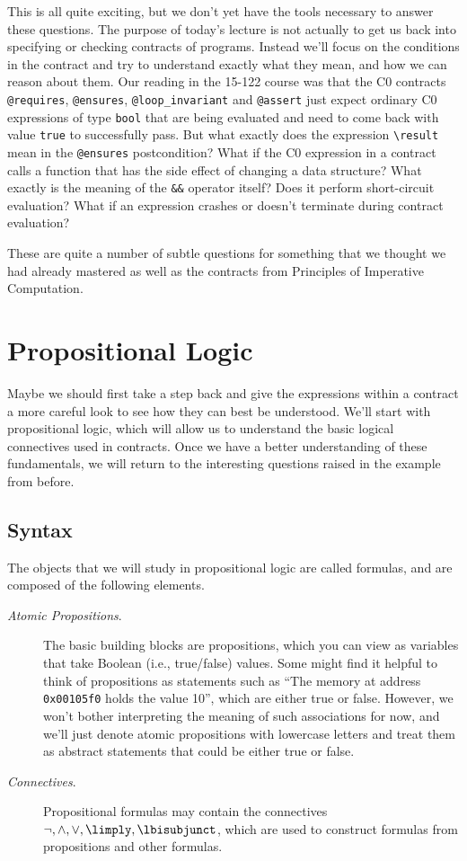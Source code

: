 \documentclass[11pt,twoside]{scrartcl}
\begin{document}
This is all quite exciting, but we don't yet have the tools necessary to answer these questions.
The purpose of today's lecture is not actually to get us back into specifying or checking contracts of programs. Instead we'll focus on the conditions in the contract and try to understand exactly what they mean, and how we can reason about them.
Our reading in the 15-122 course was that the C0 contracts \texttt{@requires}, \texttt{@ensures}, \texttt{@loop\_invariant} and \texttt{@assert} just expect ordinary C0 expressions of type \verb'bool' that are being evaluated and need to come back with value \verb'true' to successfully pass.
But what exactly does the expression \verb'\result' mean in the \texttt{@ensures} postcondition?
What if the C0 expression in a contract calls a function that has the side effect of changing a data structure?
What exactly is the meaning of the \verb'&&' operator itself?
Does it perform short-circuit evaluation?
What if an expression crashes or doesn't terminate during contract evaluation?

These are quite a number of subtle questions for something that we thought we had already mastered as well as the contracts from Principles of Imperative Computation.


\section{Propositional Logic}

Maybe we should first take a step back and give the expressions within a contract a more careful look to see how they can best be understood. We'll start with propositional logic, which will allow us to understand the basic logical connectives used in contracts.
Once we have a better understanding of these fundamentals, we will return to the interesting questions raised in the example from before.

\subsection{Syntax}

The objects that we will study in propositional logic are called formulas, and are composed of the following elements.
\begin{description}
  \item[\textit{Atomic Propositions}.] The basic building blocks are propositions, which you can view as variables that take Boolean (i.e., true/false) values. Some might find it helpful to think of propositions as statements such as ``The memory at address \verb'0x00105f0' holds the value 10'', which are either true or false. However, we won't bother interpreting the meaning of such associations for now, and we'll just denote atomic propositions with lowercase letters and treat them as abstract statements that could be either true or false.
  \item[\textit{Connectives}.] Propositional formulas may contain the connectives $\lnot, \land, \lor, \limply, \lbisubjunct$, which are used to construct formulas from propositions and other formulas.
\end{description}
\end{document}
